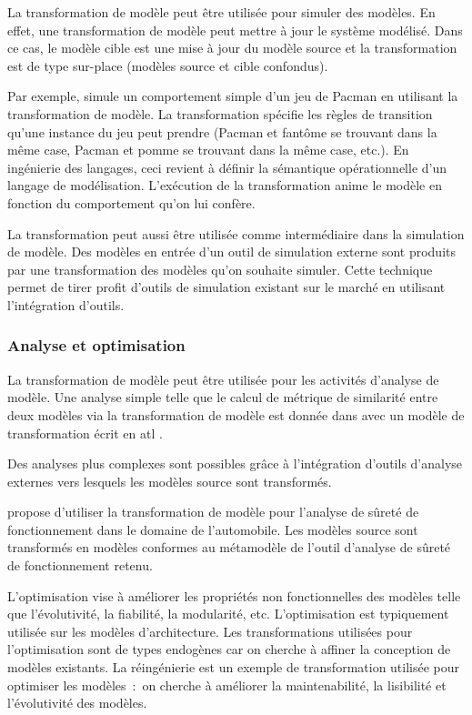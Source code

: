 La transformation de modèle peut être utilisée pour simuler des modèles. En 
effet, une transformation de modèle peut mettre à jour le système modélisé. Dans 
ce cas, le modèle cible est une mise à jour du modèle source et la 
transformation est de type sur-place (modèles source et cible confondus). 

Par exemple, \cite{syriani2011multi} simule un comportement simple d'un jeu de 
Pacman en utilisant la transformation de modèle. La transformation spécifie les 
règles de transition qu'une instance du jeu peut prendre (Pacman et fantôme se 
trouvant dans la même case, Pacman et pomme se trouvant dans la même case, 
etc.). En ingénierie des langages, ceci revient à définir la sémantique 
opérationnelle d'un langage de modélisation. L'exécution de la transformation 
anime le modèle en fonction du comportement qu'on lui confère.

La transformation peut aussi être utilisée comme intermédiaire dans la 
simulation de modèle. Des modèles en entrée d'un outil de simulation externe 
sont produits par une transformation des modèles qu'on souhaite simuler. Cette 
technique permet de tirer profit d'outils de simulation existant sur le marché 
en utilisant l'intégration d'outils.

\subsubsection{Analyse et optimisation}

La transformation de modèle peut être utilisée pour les activités d'analyse de 
modèle. Une analyse simple telle que le calcul de métrique de similarité entre 
deux modèles via la transformation de modèle est donnée dans \cite{del2007semi} 
avec un modèle de transformation écrit en \gls{atl} \cite{jouault2006transforming}. 

Des analyses plus complexes sont possibles grâce à l'intégration d'outils 
d'analyse externes vers lesquels les modèles source sont transformés.

\cite{biehl2010integrating} propose d'utiliser la transformation de modèle pour 
l'analyse de sûreté de fonctionnement dans le domaine de l'automobile. Les 
modèles source sont transformés en modèles conformes au métamodèle de l'outil 
d'analyse de sûreté de fonctionnement retenu.
 
L'optimisation vise à améliorer les propriétés non fonctionnelles des modèles 
telle que l'évolutivité, la fiabilité, la modularité, etc. L'optimisation est 
typiquement utilisée sur les modèles d'architecture. Les transformations 
utilisées pour l'optimisation sont de types endogènes car on cherche à affiner 
la conception de modèles existants. La réingénierie est un exemple de 
transformation utilisée pour optimiser les modèles~:~on cherche à améliorer la 
maintenabilité, la lisibilité et l'évolutivité des modèles.



